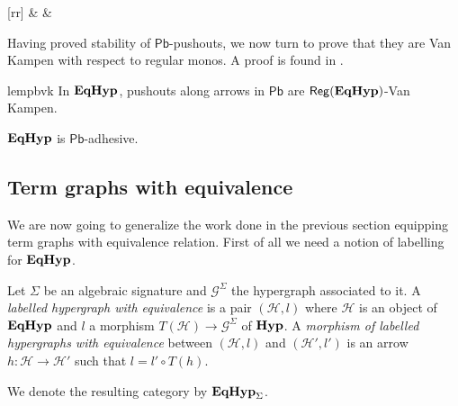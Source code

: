 \documentclass[3p]{elsarticle}
\newcommand{\pbc}{\mathsf{Pb}}
\newcommand{\catname}[1]{\textbf{\textup{#1}}}
\newcommand{\hyp}{\catname{Hyp}}
\newcommand{\EqHyp}{\catname{EqHyp}} %
\newcommand{\reg}{\mathsf{Reg}}
\theoremstyle{remark}
\theoremstyle{definition}
\begin{document}
\begin{exa}
\begin{minipage}[r]{.60\linewidth}
{
                \ar@{>->}[rr] & & 
                 }
  \end{minipage}
\end{exa}


Having proved stability of $\pbc$-pushouts, we now turn to prove that they are Van Kampen with respect to regular monos.
%
A proof is found in .

\begin{restatable}{lem}{pbvk}\label{lemma:van_kampen}
	In $\EqHyp$, pushouts along arrows in $\pbc$ are $\reg(\EqHyp)$-Van Kampen.
\end{restatable}

\begin{cor}\label{cor:eqade}
	$\EqHyp$ is $\pbc$-adhesive.
\end{cor}

%
%

\subsection{Term graphs with equivalence}


We are now going to generalize the work done in the previous section equipping term graphs with equivalence relation. First of all we need a notion of labelling for $\EqHyp$. 

\begin{defi}
	Let $\Sigma$ be an algebraic signature and $\mathcal{G}^{\Sigma}$ the hypergraph associated to it. A \emph{labelled hypergraph with equivalence} is a pair $(\mathcal{H}, l)$ where $\mathcal{H}$ is an object of $\EqHyp$ and $l$ a morphism $T(\mathcal{H})\to \mathcal{G}^\Sigma$ of $\hyp$. A \emph{morphism of labelled hypergraphs with equivalence} between $(\mathcal{H}, l)$ and $(\mathcal{H}', l')$ is an arrow $h\colon \mathcal{H}\to \mathcal{H}'$ such that $l= l'\circ T(h)$.
	
	We denote the resulting category by $\EqHyp_\Sigma$.
\end{defi}
\end{document}
